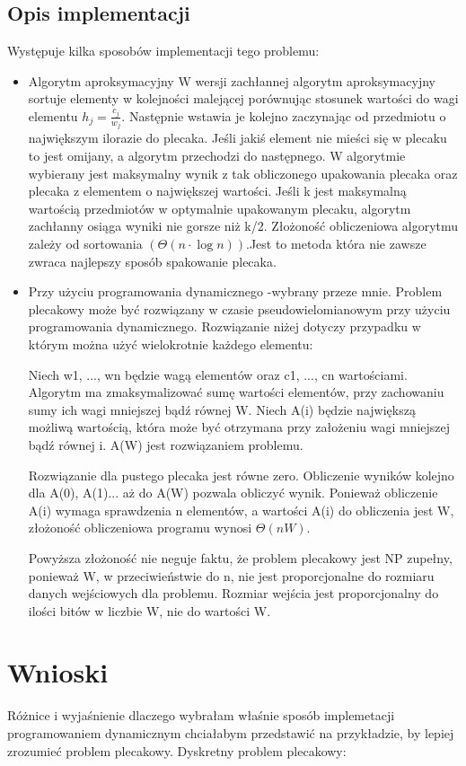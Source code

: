 \documentclass[11pt]{article}
\begin{document}
\subsection{Opis implementacji}
Występuje kilka sposobów implementacji tego problemu:
\begin{itemize}
\item Algorytm aproksymacyjny 
W wersji zachłannej algorytm aproksymacyjny sortuje elementy w kolejności malejącej porównując stosunek wartości do wagi elementu \begin{math}h_j = \frac{c_j}{w_j}.\end{math} Następnie wstawia je kolejno zaczynając od przedmiotu o największym ilorazie do plecaka. Jeśli jakiś element nie mieści się w plecaku to jest omijany, a algorytm przechodzi do następnego. W algorytmie wybierany jest maksymalny wynik z tak obliczonego upakowania plecaka oraz plecaka z elementem o największej wartości. Jeśli k jest maksymalną wartością przedmiotów w optymalnie upakowanym plecaku, algorytm zachłanny osiąga wyniki nie gorsze niż k/2. Złożoność obliczeniowa algorytmu zależy od sortowania $(\Theta(n \cdot \log{n}))$.Jest to metoda która nie zawsze zwraca najlepszy sposób spakowanie plecaka. 
\newpage
\item Przy użyciu programowania dynamicznego -wybrany przeze mnie.
Problem plecakowy może być rozwiązany w czasie pseudowielomianowym przy użyciu programowania dynamicznego. Rozwiązanie niżej dotyczy przypadku w którym można użyć wielokrotnie każdego elementu:

Niech w1, ..., wn będzie wagą elementów oraz c1, ..., cn wartościami. Algorytm ma zmaksymalizować sumę wartości elementów, przy zachowaniu sumy ich wagi mniejszej bądź równej W. Niech A(i) będzie największą możliwą wartością, która może być otrzymana przy założeniu wagi mniejszej bądź równej i. A(W) jest rozwiązaniem problemu.

Rozwiązanie dla pustego plecaka jest równe zero. Obliczenie wyników kolejno dla A(0), A(1)... aż do A(W) pozwala obliczyć wynik. Ponieważ obliczenie A(i) wymaga sprawdzenia n elementów, a wartości A(i) do obliczenia jest W, złożoność obliczeniowa programu wynosi $\Theta(nW)$.

Powyższa złożoność nie neguje faktu, że problem plecakowy jest NP zupełny, ponieważ W, w przeciwieństwie do n, nie jest proporcjonalne do rozmiaru danych wejściowych dla problemu. Rozmiar wejścia jest proporcjonalny do ilości bitów w liczbie W, nie do wartości W.
\end{itemize}
\section{Wnioski}
Różnice i wyjaśnienie dlaczego wybrałam właśnie sposób implemetacji programowaniem dynamicznym chciałabym przedstawić na przykładzie, by lepiej zrozumieć problem plecakowy.
Dyskretny problem plecakowy:
\end{document}
